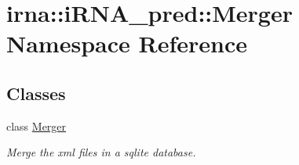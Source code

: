 \hypertarget{namespaceirna_1_1iRNA__pred_1_1Merger}{
\section{irna\-:\-:i\-R\-N\-A\-\_\-pred\-:\-:\-Merger \-Namespace \-Reference}
\label{namespaceirna_1_1iRNA__pred_1_1Merger}
}
\subsection*{\-Classes}
\begin{DoxyCompactItemize}
\item 
class \hyperlink{classirna_1_1iRNA__pred_1_1Merger_1_1Merger}{\-Merger}
\begin{DoxyCompactList}\small\item\em \-Merge the xml files in a sqlite database. \end{DoxyCompactList}\end{DoxyCompactItemize}
